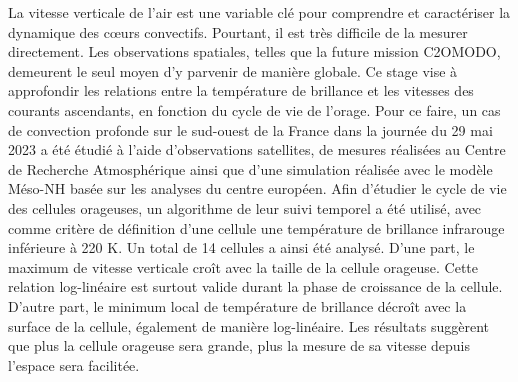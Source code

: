 \documentclass[12pt]{article}
\begin{document}
\newpage
\begin{abstractbox}

La vitesse verticale de l’air est une variable clé pour comprendre et caractériser la dynamique des cœurs convectifs. Pourtant, il est très difficile de la mesurer directement. Les observations spatiales, telles que la future mission C2OMODO, demeurent le seul moyen d’y parvenir de manière globale. Ce stage vise à approfondir les relations entre la température de brillance et les vitesses des courants ascendants, en fonction du cycle de vie de l’orage. Pour ce faire, un cas de convection profonde sur le sud-ouest de la France dans la journée du 29 mai 2023 a été étudié à l’aide d’observations satellites, de mesures réalisées au Centre de Recherche Atmosphérique ainsi que d’une simulation réalisée avec le modèle Méso-NH basée sur les analyses du centre européen. Afin d’étudier le cycle de vie des cellules orageuses, un algorithme de leur suivi temporel a été utilisé, avec comme critère de définition d'une cellule une température de brillance infrarouge inférieure à 220 K. Un total de 14 cellules a ainsi été analysé. D'une part, le maximum de vitesse verticale croît avec la taille de la cellule orageuse. Cette relation log-linéaire est surtout valide durant la phase de croissance de la cellule. D'autre part, le minimum local de température de brillance décroît avec la surface de la cellule, également de manière log-linéaire. Les résultats suggèrent que plus la cellule orageuse sera grande, plus la mesure de sa vitesse depuis l'espace sera facilitée.
    
\end{abstractbox}

\vspace{1cm}

\tableofcontents

\newpage
\end{document}

